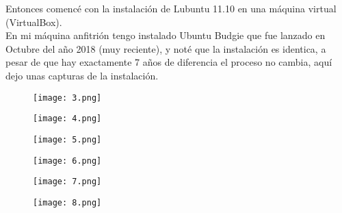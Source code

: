 \documentclass[11pt, a4paper]{report}
\begin{document}
  Entonces comencé con la instalación de Lubuntu 11.10 en una máquina virtual
  (VirtualBox). \\

  En mi máquina anfitrión tengo instalado Ubuntu Budgie que fue lanzado en
  Octubre del año 2018 (muy reciente), y noté que la instalación es identica, a
  pesar de que hay exactamente 7 años de diferencia el proceso no cambia, aquí
  dejo unas capturas de la instalación. \\

  \begin{figure}[!ht] 
    \begin{center}  
      \texttt{[image: 3.png]} 
      \caption{} 
    \end{center} 
  \end{figure}

  \begin{figure}[!ht] 
    \begin{center}  
      \texttt{[image: 4.png]} 
      \caption{} 
    \end{center} 
  \end{figure}

  \begin{figure}[!ht] 
    \begin{center}  
      \texttt{[image: 5.png]} 
      \caption{} 
    \end{center} 
  \end{figure}

  \begin{figure}[!ht] 
    \begin{center}  
      \texttt{[image: 6.png]} 
      \caption{} 
    \end{center} 
  \end{figure}

  \begin{figure}[!ht] 
    \begin{center}  
      \texttt{[image: 7.png]} 
      \caption{} 
    \end{center} 
  \end{figure}

  \begin{figure}[!ht] 
    \begin{center}  
      \texttt{[image: 8.png]} 
      \caption{} 
    \end{center} 
  \end{figure}
\end{document}

